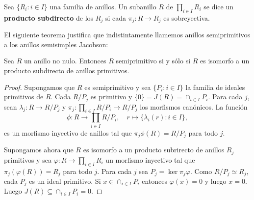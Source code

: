 %
%


\begin{definition}
	Sea $\{R_i:i\in I\}$ una familia de anillos. Un subanillo $R$ de
	$\prod_{i\in I}R_i$ se dice un \textbf{producto subdirecto} de los $R_j$ si
	cada $\pi_j\colon R\to R_j$ es sobreyectiva. 
\end{definition}

El siguiente teorema justifica que indistintamente llamemos anillos
semiprimitivos a los anillos semisimples Jacobson:

\begin{theorem}
	\label{thm:subdirecto}
	Sea $R$ un anillo no nulo. Entonces $R$ semiprimitivo si y sólo si $R$ es
	isomorfo a un producto subdirecto de anillos primitivos.
\end{theorem}

\begin{proof}
	Supongamos que $R$ es semiprimitivo y sea $\{P_i:i\in I\}$ la familia de
	ideales primitivos de $R$. Cada $R/P_j$ es primitivo y
	$\{0\}=J(R)=\cap_{i\in I}P_i$. Para cada $j$, sean $\lambda_j\colon R\to
	R/P_j$ y $\pi_j\colon \prod_{i\in I}R/P_i\to R/P_j$ los morfismos
	canónicos. La función
	\[
		\phi\colon R\to\prod_{i\in I}R/P_i,\quad
		r\mapsto \{\lambda_i(r):i\in I\},
	\]
	es un morfismo inyectivo de anillos tal que $\pi_j\phi(R)=R/P_j$ para todo
	$j$.

	Supongamos ahora que $R$ es isomorfo a un producto subrirecto de anillos
	$R_j$ primitivos y sea $\varphi\colon R\to\prod_{i\in I}R_i$ un morfismo
	inyectivo tal que $\pi_j(\varphi(R))=R_j$ para todo $j$. Para cada $j$ sea
	$P_j=\ker\pi_j\varphi$. Como $R/P_j\simeq R_j$, cada $P_j$ es un ideal
	primitivo. Si $x\in\cap_{i\in I}P_i$ entonces $\varphi(x)=0$ y luego $x=0$.
	Luego $J(R)\subseteq\cap_{i\in I} P_i=0$. 
\end{proof}

